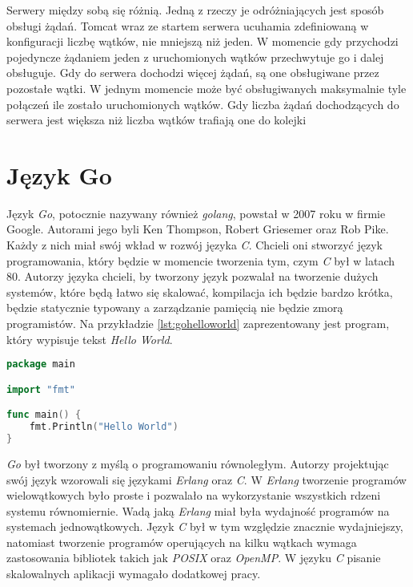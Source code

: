 Serwery między sobą się różnią. Jedną z rzeczy je odróżniających jest sposób obsługi żądań. Tomcat wraz ze startem serwera ucuhamia zdefiniowaną w konfiguracji liczbę wątków, nie mniejszą niż jeden. W momencie gdy przychodzi pojedyncze żądaniem jeden z uruchomionych wątków przechwytuje go i dalej obsługuje. Gdy do serwera dochodzi więcej żądań, są one obsługiwane przez pozostałe wątki. W jednym momencie może być obsługiwanych maksymalnie tyle połączeń ile zostało uruchomionych wątków. Gdy liczba żądań dochodzących do serwera jest większa niż liczba wątków trafiają one do kolejki 



\section{Język Go}
Język \textsl{Go}, potocznie nazywany również \textsl{golang}, powstał w 2007 roku w firmie Google. Autorami jego byli Ken Thompson, Robert Griesemer oraz Rob Pike\cite{programmingingo}. Każdy z nich miał swój wkład w rozwój języka \textsl{C}. Chcieli oni stworzyć język programowania, który będzie w momencie tworzenia tym, czym \textsl{C} był w latach 80. Autorzy języka chcieli, by tworzony język pozwalał na tworzenie dużych systemów, które będą łatwo się skalować, kompilacja ich będzie bardzo krótka, będzie statycznie typowany a zarządzanie pamięcią nie będzie zmorą programistów. Na przykładzie \ref{lst:gohelloworld} zaprezentowany jest program, który wypisuje tekst \textsl{Hello World}.
\begin{lstlisting}[language=Go, caption={Przykład programu w języku Go}, label={lst:gohelloworld}]
package main

import "fmt"

func main() {
	fmt.Println("Hello World")
}
\end{lstlisting}

\textsl{Go} był tworzony z myślą o programowaniu równoległym. Autorzy projektując swój język wzorowali się językami \textsl{Erlang} oraz \textsl{C}. W \textsl{Erlang} tworzenie programów wielowątkowych było proste i pozwalało na wykorzystanie wszystkich rdzeni systemu równomiernie. Wadą jaką \textsl{Erlang} miał była wydajność programów na systemach jednowątkowych. Język \textsl{C} był w tym względzie znacznie wydajniejszy, natomiast tworzenie programów operujących na kilku wątkach wymaga zastosowania bibliotek takich jak \textsl{POSIX} oraz \textsl{OpenMP}. W języku \textsl{C} pisanie skalowalnych aplikacji wymagało dodatkowej pracy.

